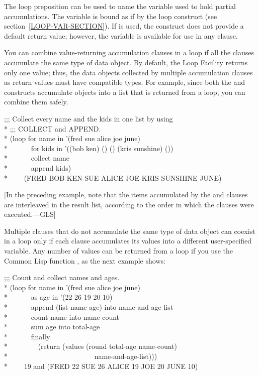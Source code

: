 \begin{new}
The loop preposition  can be used to name the 
variable used to hold partial accumulations.
The variable is bound as if by the loop
construct  (see section~\ref{LOOP-VAR-SECTION}).  If 
 is used, the construct does not provide a default return value;
however, the variable is available
for use in any  clause.

You can combine value-returning accumulation clauses in a loop if
all the clauses accumulate the same type of data object.  
By default, the Loop Facility returns only one value;
thus, the data objects collected by multiple accumulation clauses 
as return values must have compatible types. For example, since both
the  and  constructs accumulate objects into a
list that is returned from a loop, you can combine them safely.


\begin{lisp}
;;; Collect every name and the kids in one list by using \\*
;;; COLLECT and APPEND. \\*
(loop for name in '(fred sue alice joe june) \\*
~~~~~~for kids in '((bob ken) () () (kris sunshine) ()) \\*
~~~~~~collect name \\*
~~~~~~append kids) \\*
~~~\EV~(FRED BOB KEN SUE ALICE JOE KRIS SUNSHINE JUNE)
\end{lisp}
[In the preceding example, note that the items accumulated by the
 and  clauses are interleaved in the result list, according to
the order in which the clauses were executed.---GLS]

Multiple clauses that do not accumulate the same type of data object 
can coexist in a loop only if each clause accumulates its values into 
a different user-specified variable.  Any number of values can
be returned from a loop if you use the Common Lisp function ,
as the next example shows:
\begin{lisp}
;;; Count and collect names and ages. \\*
(loop for name in '(fred sue alice joe june) \\*
~~~~~~as age in '(22 26 19 20 10) \\*
~~~~~~append (list name age) into name-and-age-list \\*
~~~~~~count name into name-count \\*
~~~~~~sum age into total-age \\*
~~~~~~finally \\*
~~~~~~~~(return (values (round total-age name-count) \\*
~~~~~~~~~~~~~~~~~~~~~~~~name-and-age-list))) \\*
~~~\EV~19 {\rm and} (FRED 22 SUE 26 ALICE 19 JOE 20 JUNE 10)
\end{lisp}


\end{new}
